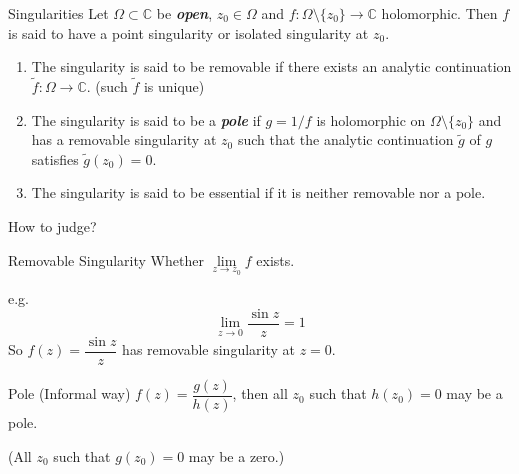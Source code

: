 \documentclass{beamer}
\begin{document}
\begin{frame}
\begin{block}{Singularities}
Let $\Omega\subset\mathbb{C}$ be \textcolor[rgb]{0,0.6,0.3}{\textbf{\textit{open}}}, $z_0\in\Omega$ and $f:\Omega\setminus\lbrace z_0\rbrace\rightarrow\mathbb{C}$ holomorphic. Then $f$ is said to have a point singularity or isolated singularity at $z_0$.
\begin{enumerate}
\item The singularity is said to be removable if there exists an analytic continuation $\tilde{f}:\Omega\rightarrow\mathbb{C}$. (such $\tilde{f} $ is unique)
\item The singularity is said to be a \textcolor[rgb]{0,0.6,0.3}{\textit{\textbf{pole}}} if $g=1/f$ is holomorphic on $\Omega\setminus\lbrace z_0\rbrace$ and has a removable singularity at $z_0$ such that the analytic continuation $\tilde{g}$ of $g$ satisfies $\tilde{g}(z_0)=0$.
\item The singularity is said to be essential if it is neither removable nor a pole.
\end{enumerate}
\end{block}
\end{frame}


\begin{frame}
\begin{block}{How to judge? }

\end{block}
\begin{block}{Removable Singularity}
Whether $\lim\limits_{z\rightarrow z_0}f$  exists.

e.g. 
$$\lim\limits_{z\rightarrow0}\dfrac{\sin z}{z}=1$$
So $f(z)=\dfrac{\sin z}{z}$ has removable singularity at $z=0$.
\end{block}
\begin{block}{Pole (Informal way)}
$f(z)=\dfrac{g(z)}{h(z)}$, then all $z_0$ such that $h(z_0)=0$ may be a pole.

 (All $z_0$ such that $g(z_0)=0$ may be a zero.)
\end{block}
\end{frame}
\end{document}
